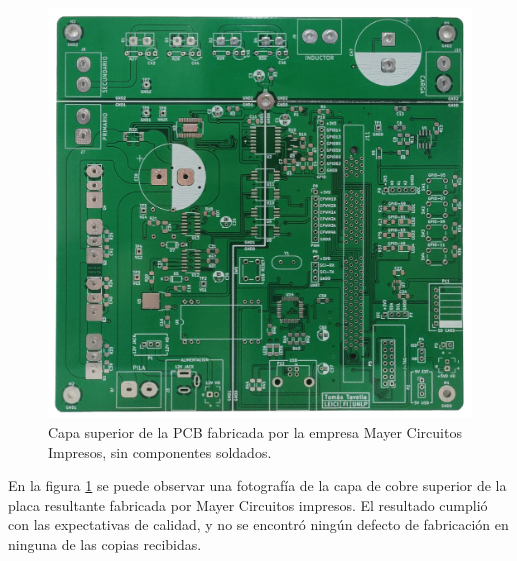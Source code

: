 \begin{figure}[h]
    \centering
    \includegraphics[scale=0.13]{Imagenes/Placa Fisica.jpg}
    \caption{Capa superior de la PCB fabricada por la empresa Mayer Circuitos Impresos, sin componentes soldados.}
    \label{placa_fisica}
\end{figure}

En la figura \ref{placa_fisica} se puede observar una fotografía de la capa de cobre superior de la placa resultante fabricada por Mayer Circuitos impresos. El resultado cumplió con las expectativas de calidad, y no se encontró ningún defecto de fabricación en ninguna de las copias recibidas.\\